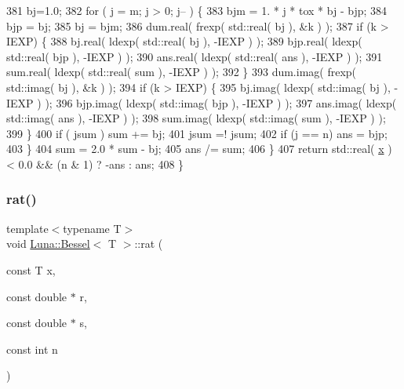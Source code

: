 \begin{DoxyCode}
381             bj=1.0;
382             \textcolor{keywordflow}{for} ( j = m; j > 0; j-- ) \{
383                 bjm = 1. * j * tox * bj - bjp;
384                 bjp = bj;
385                 bj = bjm;
386                 dum.real( frexp( std::real( bj ), &k ) );
387                 \textcolor{keywordflow}{if} (k > IEXP) \{
388                     bj.real( ldexp( std::real( bj ), -IEXP ) );
389                     bjp.real( ldexp( std::real( bjp ), -IEXP ) );
390                     ans.real( ldexp( std::real( ans ), -IEXP ) );
391                     sum.real( ldexp( std::real( sum ), -IEXP ) );
392                 \}
393             dum.imag( frexp( std::imag( bj ), &k ) );
394                 \textcolor{keywordflow}{if} (k > IEXP) \{
395                     bj.imag( ldexp( std::imag( bj ), -IEXP ) );
396                     bjp.imag( ldexp( std::imag( bjp ), -IEXP ) );
397                     ans.imag( ldexp( std::imag( ans ), -IEXP ) );
398                     sum.imag( ldexp( std::imag( sum ), -IEXP ) );
399                 \}
400                 \textcolor{keywordflow}{if} ( jsum ) sum += bj;
401                 jsum =! jsum;
402                 \textcolor{keywordflow}{if} (j == n) ans = bjp;
403             \}
404             sum = 2.0 * sum - bj;
405             ans /= sum;
406         \}
407         \textcolor{keywordflow}{return} std::real( \hyperlink{namespaceHeat__plot_aa88370c16b85b784ccbde3ed88bc1991}{x} ) < 0.0 && (n & 1) ? -ans : ans;
408       \}
\end{DoxyCode}
\mbox{\label{structLuna_1_1Bessel_aa42218eff6062d962d3fd1287c458583}} 
\subsubsection{\texorpdfstring{rat()}{rat()}}
{\footnotesize\ttfamily template$<$typename T$>$ \\
void \hyperlink{structLuna_1_1Bessel}{Luna\+::\+Bessel}$<$ T $>$\+::rat (\begin{DoxyParamCaption}\item[{const T}]{x,  }\item[{const double $\ast$}]{r,  }\item[{const double $\ast$}]{s,  }\item[{const int}]{n }\end{DoxyParamCaption})\hspace{0.3cm}{\ttfamily [inline]}}



